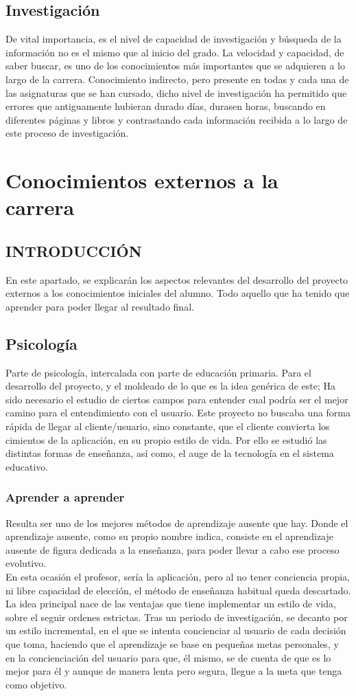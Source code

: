 \subsection{Investigación}
De vital importancia, es el nivel de capacidad de investigación y búsqueda de la información no es el mismo que al inicio del grado. La velocidad y capacidad, de saber buscar, es uno de los conocimientos más importantes que se adquieren a lo largo de la carrera. Conocimiento indirecto, pero presente en todas y cada una de las asignaturas que se han cursado, dicho nivel de investigación ha permitido que errores que antiguamente hubieran durado días, durasen horas, buscando en diferentes páginas y libros y contrastando cada información recibida a lo largo de este proceso de investigación.
\section{Conocimientos externos a la carrera}
\subsection{INTRODUCCIÓN}
En este apartado, se explicarán los aspectos relevantes del desarrollo del proyecto externos a los conocimientos iniciales del alumno. Todo aquello que ha tenido que aprender para poder llegar al resultado final.
\subsection{Psicología}
Parte de psicología, intercalada con  parte de educación primaria. Para el desarrollo del proyecto, y el moldeado de lo que es la idea genérica de este; Ha sido necesario el estudio de ciertos campos para entender cual podría ser el mejor camino para el entendimiento con el usuario. Este proyecto no buscaba una forma rápida de llegar al cliente/usuario, sino constante, que el cliente convierta los cimientos de la aplicación, en su propio estilo de vida. Por ello se estudió las distintas formas de enseñanza, así como, el auge de la tecnología en el sistema educativo.
\subsubsection{Aprender a aprender}
Resulta ser uno de los mejores métodos de aprendizaje ausente que hay. Donde el aprendizaje ausente, como su propio nombre indica, consiste en el aprendizaje ausente de figura dedicada a la enseñanza, para poder llevar a cabo ese proceso evolutivo.\\
En esta ocasión el profesor, sería la aplicación, pero al no tener conciencia propia, ni libre capacidad de elección, el método de enseñanza habitual queda descartado. \\
La idea principal nace de las ventajas que tiene implementar un estilo de vida, sobre el seguir ordenes estrictas. Tras un periodo de investigación, se decanto por un estilo incremental, en el que se intenta concienciar al usuario de cada decisión que toma, haciendo que el aprendizaje se base en pequeñas metas personales, y en la concienciación del usuario para que, él mismo, se de cuenta de que es lo mejor para él y aunque de manera lenta pero segura, llegue a la meta que tenga como objetivo.
